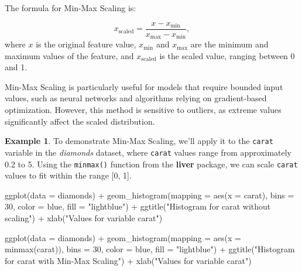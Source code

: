 \documentclass[
  11pt,
]{book}
\makeatletter
\newenvironment{Shaded}{}{}
\newcommand{\AttributeTok}[1]{#1}
\newcommand{\DecValTok}[1]{#1}
\newcommand{\FunctionTok}[1]{#1}
\newcommand{\NormalTok}[1]{#1}
\newcommand{\SpecialCharTok}[1]{\textcolor[rgb]{0.39,0.39,0.39}{#1}}
\newcommand{\StringTok}[1]{\textcolor[rgb]{0.39,0.39,0.39}{#1}}
\newenvironment{kframe}{%
\medskip{}
\setlength{\fboxsep}{.8em}
 \def\at@end@of@kframe{}%
 \ifinner\ifhmode%
  \def\at@end@of@kframe{\end{minipage}}%
  \begin{minipage}{\columnwidth}%
 \fi\fi%
 \def\FrameCommand##1{\hskip\@totalleftmargin \hskip-\fboxsep
 \colorbox{shadecolor}{##1}\hskip-\fboxsep
     \hskip-\linewidth \hskip-\@totalleftmargin \hskip\columnwidth}%
 \MakeFramed {\advance\hsize-\width
   \@totalleftmargin\z@ \linewidth\hsize
   \@setminipage}}%
 {\par\unskip\endMakeFramed%
 \at@end@of@kframe}
\renewenvironment{Shaded}{\begin{kframe}}{\end{kframe}}
\theoremstyle{definition}
\theoremstyle{definition}
\newtheorem{example}{Example}[chapter]
\theoremstyle{definition}
\theoremstyle{definition}
\theoremstyle{remark}
\makeatother
\begin{document}
The formula for Min-Max Scaling is:

\[
x_{\text{scaled}} = \frac{x - x_{\text{min}}}{x_{\text{max}} - x_{\text{min}}},
\]
where \(x\) is the original feature value, \(x_{\text{min}}\) and \(x_{\text{max}}\) are the minimum and maximum values of the feature, and \(x_{\text{scaled}}\) is the scaled value, ranging between 0 and 1.

Min-Max Scaling is particularly useful for models that require bounded input values, such as neural networks and algorithms relying on gradient-based optimization. However, this method is sensitive to outliers, as extreme values significantly affect the scaled distribution.

\begin{example}
\protect\hypertarget{exm:ex-min-max}{}\label{exm:ex-min-max}To demonstrate Min-Max Scaling, we'll apply it to the \texttt{carat} variable in the \emph{diamonds} dataset, where \texttt{carat} values range from approximately 0.2 to 5. Using the \texttt{minmax()} function from the \textbf{liver} package, we can scale \texttt{carat} values to fit within the range {[}0, 1{]}.

\begin{Shaded}
\begin{Highlighting}[]
\FunctionTok{ggplot}\NormalTok{(}\AttributeTok{data =}\NormalTok{ diamonds) }\SpecialCharTok{+}
  \FunctionTok{geom\_histogram}\NormalTok{(}\AttributeTok{mapping =} \FunctionTok{aes}\NormalTok{(}\AttributeTok{x =}\NormalTok{ carat), }\AttributeTok{bins =} \DecValTok{30}\NormalTok{,}
                 \AttributeTok{color =} \StringTok{\textquotesingle{}blue\textquotesingle{}}\NormalTok{, }\AttributeTok{fill =} \StringTok{"lightblue"}\NormalTok{) }\SpecialCharTok{+}
  \FunctionTok{ggtitle}\NormalTok{(}\StringTok{"Histogram for \textasciigrave{}carat\textasciigrave{} without scaling"}\NormalTok{) }\SpecialCharTok{+} 
  \FunctionTok{xlab}\NormalTok{(}\StringTok{"Values for variable \textasciigrave{}carat\textasciigrave{}"}\NormalTok{)}

\FunctionTok{ggplot}\NormalTok{(}\AttributeTok{data =}\NormalTok{ diamonds) }\SpecialCharTok{+}
  \FunctionTok{geom\_histogram}\NormalTok{(}\AttributeTok{mapping =} \FunctionTok{aes}\NormalTok{(}\AttributeTok{x =} \FunctionTok{minmax}\NormalTok{(carat)), }\AttributeTok{bins =} \DecValTok{30}\NormalTok{,}
                 \AttributeTok{color =} \StringTok{\textquotesingle{}blue\textquotesingle{}}\NormalTok{, }\AttributeTok{fill =} \StringTok{"lightblue"}\NormalTok{) }\SpecialCharTok{+}
  \FunctionTok{ggtitle}\NormalTok{(}\StringTok{"Histogram for \textasciigrave{}carat\textasciigrave{} with Min{-}Max Scaling"}\NormalTok{) }\SpecialCharTok{+} 
  \FunctionTok{xlab}\NormalTok{(}\StringTok{"Values for variable \textasciigrave{}carat\textasciigrave{}"}\NormalTok{)}
\end{Highlighting}
\end{Shaded}


\end{example}
\end{document}
